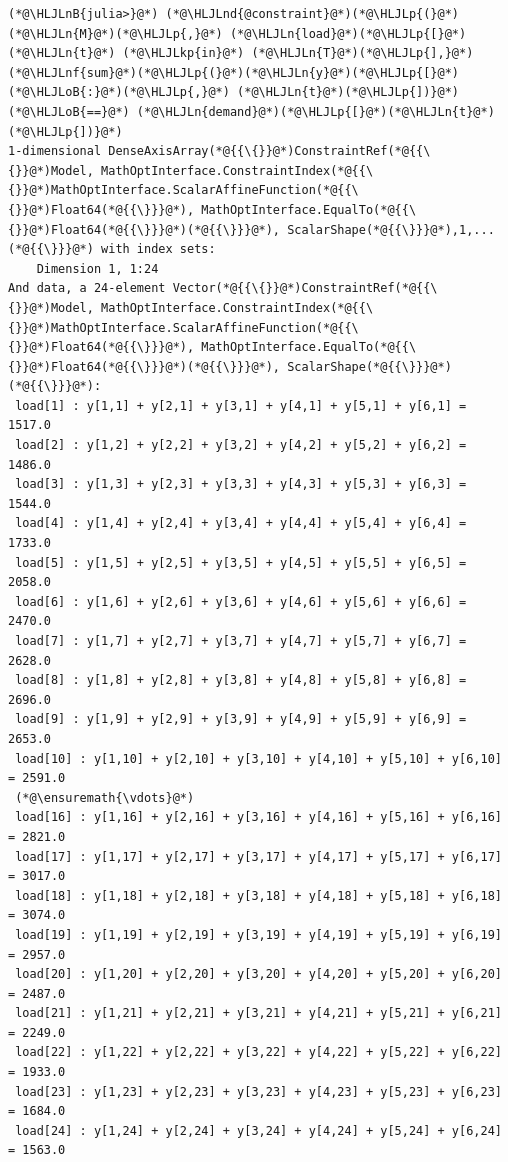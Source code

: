 \documentclass[12pt,a4paper]{article}
\newcommand{\HLJLkp}[1]{\textcolor[RGB]{148,91,176}{\textbf{#1}}}
\newcommand{\HLJLn}[1]{#1}
\newcommand{\HLJLnd}[1]{\textcolor[RGB]{214,102,97}{#1}}
\newcommand{\HLJLnf}[1]{\textcolor[RGB]{66,102,213}{#1}}
\newcommand{\HLJLnB}[1]{\textcolor[RGB]{59,151,46}{#1}}
\newcommand{\HLJLoB}[1]{\textcolor[RGB]{102,102,102}{\textbf{#1}}}
\newcommand{\HLJLp}[1]{#1}
\begin{document}
\begin{lstlisting}
(*@\HLJLnB{julia>}@*) (*@\HLJLnd{@constraint}@*)(*@\HLJLp{(}@*)(*@\HLJLn{M}@*)(*@\HLJLp{,}@*) (*@\HLJLn{load}@*)(*@\HLJLp{[}@*)(*@\HLJLn{t}@*) (*@\HLJLkp{in}@*) (*@\HLJLn{T}@*)(*@\HLJLp{],}@*) (*@\HLJLnf{sum}@*)(*@\HLJLp{(}@*)(*@\HLJLn{y}@*)(*@\HLJLp{[}@*)(*@\HLJLoB{:}@*)(*@\HLJLp{,}@*) (*@\HLJLn{t}@*)(*@\HLJLp{])}@*) (*@\HLJLoB{==}@*) (*@\HLJLn{demand}@*)(*@\HLJLp{[}@*)(*@\HLJLn{t}@*)(*@\HLJLp{])}@*)
1-dimensional DenseAxisArray(*@{{\{}}@*)ConstraintRef(*@{{\{}}@*)Model, MathOptInterface.ConstraintIndex(*@{{\{}}@*)MathOptInterface.ScalarAffineFunction(*@{{\{}}@*)Float64(*@{{\}}}@*), MathOptInterface.EqualTo(*@{{\{}}@*)Float64(*@{{\}}}@*)(*@{{\}}}@*), ScalarShape(*@{{\}}}@*),1,...(*@{{\}}}@*) with index sets:
    Dimension 1, 1:24
And data, a 24-element Vector(*@{{\{}}@*)ConstraintRef(*@{{\{}}@*)Model, MathOptInterface.ConstraintIndex(*@{{\{}}@*)MathOptInterface.ScalarAffineFunction(*@{{\{}}@*)Float64(*@{{\}}}@*), MathOptInterface.EqualTo(*@{{\{}}@*)Float64(*@{{\}}}@*)(*@{{\}}}@*), ScalarShape(*@{{\}}}@*)(*@{{\}}}@*):
 load[1] : y[1,1] + y[2,1] + y[3,1] + y[4,1] + y[5,1] + y[6,1] = 1517.0
 load[2] : y[1,2] + y[2,2] + y[3,2] + y[4,2] + y[5,2] + y[6,2] = 1486.0
 load[3] : y[1,3] + y[2,3] + y[3,3] + y[4,3] + y[5,3] + y[6,3] = 1544.0
 load[4] : y[1,4] + y[2,4] + y[3,4] + y[4,4] + y[5,4] + y[6,4] = 1733.0
 load[5] : y[1,5] + y[2,5] + y[3,5] + y[4,5] + y[5,5] + y[6,5] = 2058.0
 load[6] : y[1,6] + y[2,6] + y[3,6] + y[4,6] + y[5,6] + y[6,6] = 2470.0
 load[7] : y[1,7] + y[2,7] + y[3,7] + y[4,7] + y[5,7] + y[6,7] = 2628.0
 load[8] : y[1,8] + y[2,8] + y[3,8] + y[4,8] + y[5,8] + y[6,8] = 2696.0
 load[9] : y[1,9] + y[2,9] + y[3,9] + y[4,9] + y[5,9] + y[6,9] = 2653.0
 load[10] : y[1,10] + y[2,10] + y[3,10] + y[4,10] + y[5,10] + y[6,10] = 2591.0
 (*@\ensuremath{\vdots}@*)
 load[16] : y[1,16] + y[2,16] + y[3,16] + y[4,16] + y[5,16] + y[6,16] = 2821.0
 load[17] : y[1,17] + y[2,17] + y[3,17] + y[4,17] + y[5,17] + y[6,17] = 3017.0
 load[18] : y[1,18] + y[2,18] + y[3,18] + y[4,18] + y[5,18] + y[6,18] = 3074.0
 load[19] : y[1,19] + y[2,19] + y[3,19] + y[4,19] + y[5,19] + y[6,19] = 2957.0
 load[20] : y[1,20] + y[2,20] + y[3,20] + y[4,20] + y[5,20] + y[6,20] = 2487.0
 load[21] : y[1,21] + y[2,21] + y[3,21] + y[4,21] + y[5,21] + y[6,21] = 2249.0
 load[22] : y[1,22] + y[2,22] + y[3,22] + y[4,22] + y[5,22] + y[6,22] = 1933.0
 load[23] : y[1,23] + y[2,23] + y[3,23] + y[4,23] + y[5,23] + y[6,23] = 1684.0
 load[24] : y[1,24] + y[2,24] + y[3,24] + y[4,24] + y[5,24] + y[6,24] = 1563.0


\end{lstlisting}
\end{document}
